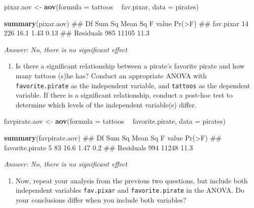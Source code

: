 \documentclass[]{book}
\newenvironment{Shaded}{\begin{snugshade}}{\end{snugshade}}
\newcommand{\KeywordTok}[1]{\textcolor[rgb]{0.13,0.29,0.53}{\textbf{#1}}}
\newcommand{\DataTypeTok}[1]{\textcolor[rgb]{0.13,0.29,0.53}{#1}}
\newcommand{\StringTok}[1]{\textcolor[rgb]{0.31,0.60,0.02}{#1}}
\newcommand{\OperatorTok}[1]{\textcolor[rgb]{0.81,0.36,0.00}{\textbf{#1}}}
\newcommand{\NormalTok}[1]{#1}
\providecommand{\tightlist}{%
  \setlength{\itemsep}{0pt}\setlength{\parskip}{0pt}}
\theoremstyle{definition}
\theoremstyle{definition}
\theoremstyle{remark}
\begin{document}
\begin{Shaded}
\begin{Highlighting}[]
\NormalTok{pixar.aov <-}\StringTok{ }\KeywordTok{aov}\NormalTok{(}\DataTypeTok{formula =}\NormalTok{ tattoos }\OperatorTok{~}\StringTok{ }\NormalTok{fav.pixar,}
             \DataTypeTok{data =}\NormalTok{ pirates)}

\KeywordTok{summary}\NormalTok{(pixar.aov)}
\NormalTok{##              Df Sum Sq Mean Sq F value Pr(>F)}
\NormalTok{## fav.pixar    14    226    16.1    1.43   0.13}
\NormalTok{## Residuals   985  11105    11.3}
\end{Highlighting}
\end{Shaded}

\emph{Answer: No, there is no significant effect}

\begin{enumerate}
\def\labelenumi{\arabic{enumi}.}
\setcounter{enumi}{1}
\tightlist
\item
  Is there a significant relationship between a pirate's favorite pirate
  and how many tattoos (s)he has? Conduct an appropriate ANOVA with
  \texttt{favorite.pirate} as the independent variable, and
  \texttt{tattoos} as the dependent variable. If there is a significant
  relationship, conduct a post-hoc test to determine which levels of the
  independent variable(s) differ.
\end{enumerate}

\begin{Shaded}
\begin{Highlighting}[]
\NormalTok{favpirate.aov <-}\StringTok{ }\KeywordTok{aov}\NormalTok{(}\DataTypeTok{formula =}\NormalTok{ tattoos }\OperatorTok{~}\StringTok{ }\NormalTok{favorite.pirate,}
                     \DataTypeTok{data =}\NormalTok{ pirates)}

\KeywordTok{summary}\NormalTok{(favpirate.aov)}
\NormalTok{##                  Df Sum Sq Mean Sq F value Pr(>F)}
\NormalTok{## favorite.pirate   5     83    16.6    1.47    0.2}
\NormalTok{## Residuals       994  11248    11.3}
\end{Highlighting}
\end{Shaded}

\emph{Answer: No, there is no significant effect}

\begin{enumerate}
\def\labelenumi{\arabic{enumi}.}
\setcounter{enumi}{2}
\tightlist
\item
  Now, repeat your analysis from the previous two questions, but include
  both independent variables \texttt{fav.pixar} and
  \texttt{favorite.pirate} in the ANOVA. Do your conclusions differ when
  you include both variables?
\end{enumerate}
\end{document}
